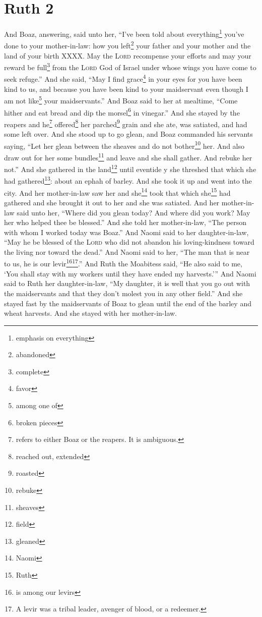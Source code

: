 \section{Ruth 2}\label{Ruth 2}
\begin{enumerate}[align=center]
     And Boaz, answering, said unto her, ``I've been told about everything\footnote{emphasis on everything} you've done to your mother-in-law: how you left\footnote{abandoned} your father and your mother and the land of your birth XXXX.%
     May the \textsc{Lord} recompense your efforts and may your reward be full\footnote{complete} from the \textsc{Lord} God of Israel under whose wings you have come to seek refuge.''%
     And she said, ``May I find grace\footnote{favor} in your eyes for you have been kind to us, and because you have been kind to your maidservant even though I am not like\footnote{among one of} your maidservants.''%
     And Boaz said to her at mealtime, ``Come hither and eat bread and dip the morsel\footnote{broken pieces} in vinegar.'' And she stayed by the reapers and he\footnote{refers to either Boaz or the reapers. It is ambiguous.} offered\footnote{reached out, extended} her parched\footnote{roasted} grain and she ate, was satiated, and had some left over.%
     And she stood up to go glean, and Boaz commanded his servants saying, ``Let her glean between the sheaves and do not bother\footnote{rebuke} her.%
     And also draw out for her some bundles\footnote{sheaves} and leave and she shall gather. And rebuke her not.''%
     And she gathered in the land\footnote{field} until eventide y she threshed that which she had gathered\footnote{gleaned}: about an ephah of barley.%
     And she took it up and went into the city. And her mother-in-law saw her and she\footnote{Naomi} took that which she\footnote{Ruth} had gathered and she brought it out to her and she was satiated.%
     And her mother-in-law said unto her, ``Where did you glean today? And where did you work? May her who helped thee be blessed.'' And she told her mother-in-law, ``The person with whom I worked today was Boaz.''%
     And Naomi said to her daughter-in-law, ``May he be blessed of the \textsc{Lord} who did not abandon his loving-kindness toward the living nor toward the dead.'' And Naomi said to her, ``The man that is near to us, he is our levir\footnote{is among our levirs}\footnote{A levir was a tribal leader, avenger of blood, or a redeemer.}.''%
     And Ruth the Moabitess said, ``He also said to me, `You shall stay with my workers until they have ended my harvests.'''%
     And Naomi said to Ruth her daughter-in-law, ``My daughter, it is well that you go out with the maidservants and that they don't molest you in any other field.''%
     And she stayed fast by the maidservants of Boaz to glean until the end of the barley and wheat harvests. And she stayed with her mother-in-law.%
\end{enumerate}
